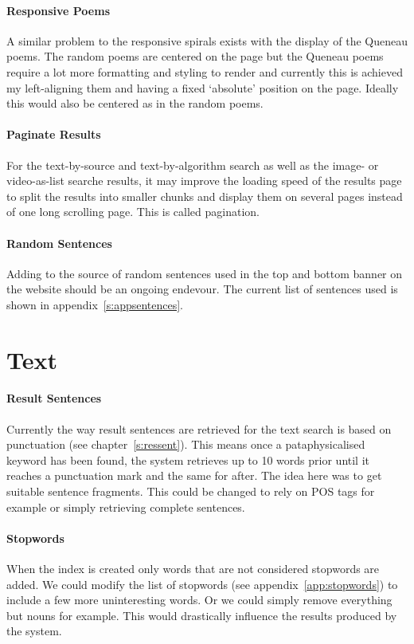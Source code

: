 \paragraph{Responsive Poems} 
A similar problem to the responsive spirals exists with the display of the Queneau poems. The random poems are centered on the page but the Queneau poems require a lot more formatting and styling to render and currently this is achieved my left-aligning them and having a fixed `absolute' position on the page. Ideally this would also be centered as in the random poems. 

\paragraph{Paginate Results}
For the text-by-source and text-by-algorithm search as well as the image- or video-as-list searche results, it may improve the loading speed of the results page to split the results into smaller chunks and display them on several pages instead of one long scrolling page. This is called pagination.

\paragraph{Random Sentences} 
Adding to the source of random sentences used in the top and bottom banner on the website should be an ongoing endevour. The current list of sentences used is shown in appendix~\ref{s:appsentences}.


\section{Text}

\paragraph{Result Sentences} 
Currently the way result sentences are retrieved for the text search is based on punctuation (see chapter~\ref{s:ressent}). This means once a pataphysicalised keyword has been found, the system retrieves up to \num{10} words prior until it reaches a punctuation mark and the same for after. The idea here was to get suitable sentence fragments. This could be changed to rely on \ac{POS} tags for example or simply retrieving complete sentences.

\paragraph{Stopwords}
When the index is created only words that are not considered stopwords are added. We could modify the list of stopwords (see appendix~\ref{app:stopwords}) to include a few more uninteresting words. Or we could simply remove everything but nouns for example. This would drastically influence the results produced by the system.

